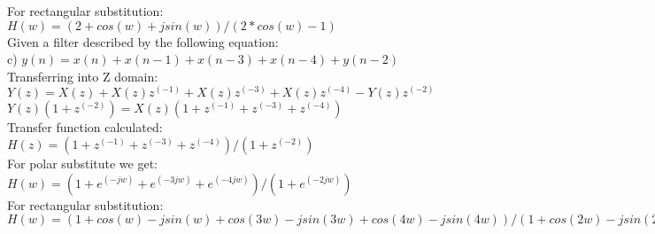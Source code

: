 For rectangular substitution:\\

$ H(w) = (2 + cos(w) + jsin(w))/(2*cos(w)-1) $\\

Given a filter described by the following equation:\\
c) $y(n)= x(n) + x(n-1) + x(n-3) + x(n-4) +  y(n-2)$\\

Transferring into Z domain:\\

$ Y(z) = X(z) + X(z)z^(-1) + X(z)z^(-3) + X(z)z^(-4) - Y(z)z^(-2) $\\

$ Y(z)(1+z^(-2)) = X(z)(1 + z^(-1) + z^(-3) + z^(-4))$\\

Transfer function calculated:\\

$ H(z)= (1+z^(-1)+z^(-3)+z^(-4))/(1+z^(-2)) $\\

For polar substitute we get:\\

$ H(w) = (1+e^(-jw)+e^(-3jw)+e^(-4jw))/(1+e^(-2jw))$\\

For rectangular substitution:\\

$ H(w) = (1+cos(w)-jsin(w)+cos(3w)-jsin(3w)+cos(4w)-jsin(4w))/
		  (1 + cos(2w)-jsin(2w)) $\\


